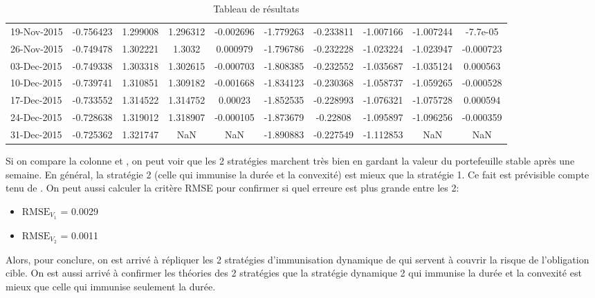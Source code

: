 \documentclass[letterpaper,11pt]{article}
\newcommand{\?}{\stackrel{?}{=}}
\begin{document}
\begin{table}[htbp]
\begin{adjustbox}{width=1.2\textwidth,center=\textwidth}
\begin{tabular}{ l  *9c }
19-Nov-2015 & -0.756423 & 1.299008 & 1.296312 & -0.002696 & -1.779263 & -0.233811 & -1.007166 & -1.007244 & -7.7e-05 \\
\rowcolor{black!10}26-Nov-2015 & -0.749478 & 1.302221 & 1.3032 & 0.000979 & -1.796786 & -0.232228 & -1.023224 & -1.023947 & -0.000723 \\
03-Dec-2015 & -0.749338 & 1.303318 & 1.302615 & -0.000703 & -1.808385 & -0.232552 & -1.035687 & -1.035124 & 0.000563 \\
\rowcolor{black!10}10-Dec-2015 & -0.739741 & 1.310851 & 1.309182 & -0.001668 & -1.834123 & -0.230368 & -1.058737 & -1.059265 & -0.000528 \\
17-Dec-2015 & -0.733552 & 1.314522 & 1.314752 & 0.00023 & -1.852535 & -0.228993 & -1.076321 & -1.075728 & 0.000594 \\
\rowcolor{black!10}24-Dec-2015 & -0.728638 & 1.319012 & 1.318907 & -0.000105 & -1.873679 & -0.22808 & -1.095897 & -1.096256 & -0.000359 \\
31-Dec-2015 & -0.725362 & 1.321747 & NaN & NaN & -1.890883 & -0.227549 & -1.112853 & NaN & NaN \\
\bottomrule
\end{tabular}
\end{adjustbox}
\caption{Tableau de résultats}
\label{tab:generated}
\end{table}
\FloatBarrier

Si on compare la colonne  et , on peut voir que les 2 stratégies marchent très bien en gardant la valeur du portefeuille stable après une semaine. En général, la stratégie 2 (celle qui immunise la durée et la convexité) est mieux que la stratégie 1. Ce fait est prévisible compte tenu de \cite{book}. On peut aussi calculer la critère RMSE pour confirmer si quel erreure est plus grande entre les 2:

\begin{itemize}
    \item $\text{RMSE}_{V_1}$ = 0.0029
    \item $\text{RMSE}_{V_2}$ = 0.0011
\end{itemize}

Alors, pour conclure, on est arrivé à répliquer les 2 stratégies d'immunisation dynamique de \cite{book} qui servent à couvrir la risque de l'obligation cible. On est aussi arrivé à confirmer les théories des 2 stratégies que la stratégie dynamique 2 qui immunise la durée et la convexité est mieux que celle qui immunise seulement la durée.

\newpage
\printbibliography
\end{document}
